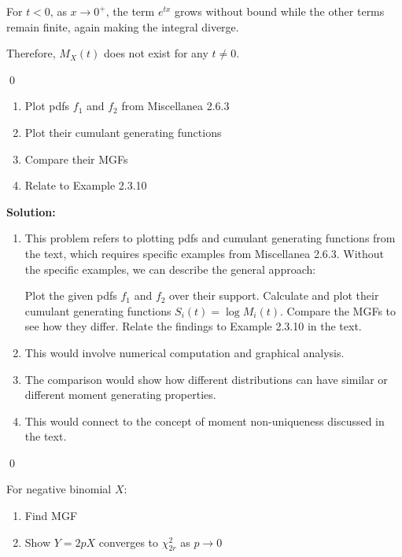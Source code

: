 For $t < 0$, as $x \to 0^+$, the term $e^{tx}$ grows without bound while the other terms remain finite, again making the integral diverge.

Therefore, $M_X(t)$ does not exist for any $t \neq 0$.


\qed
\begin{problembox}
\begin{enumerate}[label=(\alph*)]
    \item Plot pdfs $f_1$ and $f_2$ from Miscellanea 2.6.3
    \item Plot their cumulant generating functions
    \item Compare their MGFs
    \item Relate to Example 2.3.10
\end{enumerate}
\end{problembox}

\noindent\textbf{Solution:}
\begin{enumerate}[label=(\alph*)]
    \item This problem refers to plotting pdfs and cumulant generating functions from the text, which requires specific examples from Miscellanea 2.6.3. Without the specific examples, we can describe the general approach:
    
    Plot the given pdfs $f_1$ and $f_2$ over their support.
    Calculate and plot their cumulant generating functions $S_i(t) = \log M_i(t)$.
    Compare the MGFs to see how they differ.
    Relate the findings to Example 2.3.10 in the text.
    
    \item This would involve numerical computation and graphical analysis.
    
    \item The comparison would show how different distributions can have similar or different moment generating properties.
    
    \item This would connect to the concept of moment non-uniqueness discussed in the text.
\end{enumerate}


\qed
\begin{problembox}
For negative binomial $X$:
\begin{enumerate}[label=(\alph*)]
    \item Find MGF
    \item Show $Y=2pX$ converges to $\chi^2_{2r}$ as $p\to0$
\end{enumerate}
\end{problembox}

